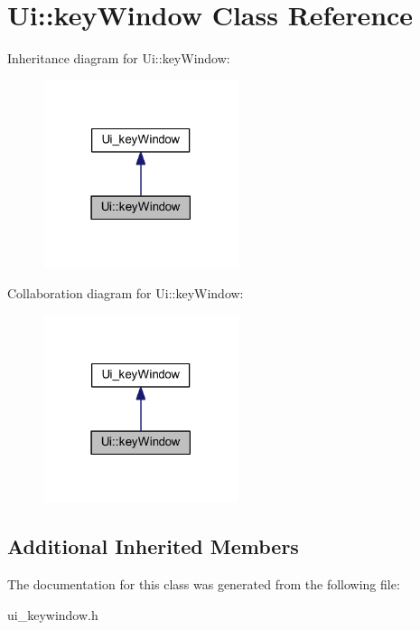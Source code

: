 \hypertarget{class_ui_1_1key_window}{}\section{Ui\+:\+:key\+Window Class Reference}
\label{class_ui_1_1key_window}


Inheritance diagram for Ui\+:\+:key\+Window\+:
\nopagebreak
\begin{figure}[H]
\begin{center}
\leavevmode
\includegraphics[width=162pt]{class_ui_1_1key_window__inherit__graph}
\end{center}
\end{figure}


Collaboration diagram for Ui\+:\+:key\+Window\+:
\nopagebreak
\begin{figure}[H]
\begin{center}
\leavevmode
\includegraphics[width=162pt]{class_ui_1_1key_window__coll__graph}
\end{center}
\end{figure}
\subsection*{Additional Inherited Members}


The documentation for this class was generated from the following file\+:\begin{DoxyCompactItemize}
\item 
ui\+\_\+keywindow.\+h\end{DoxyCompactItemize}
